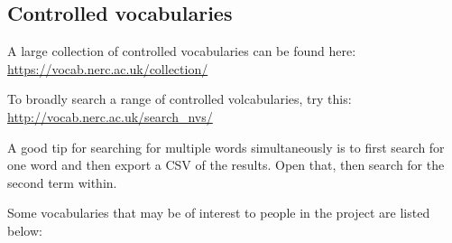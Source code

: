 \documentclass[a4paper,english, 11pt]{article}
\begin{document}
\newpage
\subsection{Controlled vocabularies}
\label{ss:controlledvocabularies}

A large collection of controlled vocabularies can be found here:
\url{https://vocab.nerc.ac.uk/collection/}

To broadly search a range of controlled volcabularies, try this:
\url{http://vocab.nerc.ac.uk/search_nvs/}

A good tip for searching for multiple words simultaneously is to first search for one word and then export a CSV of the results. Open that, then search for the second term within.

Some vocabularies that may be of interest to people in the project are listed below:
\end{document}
